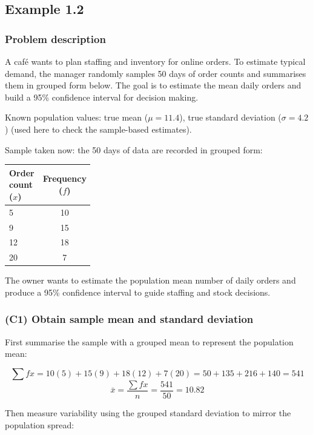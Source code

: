 \subsection{Example 1.2}\label{sec:interval-example1-2}

\subsubsection{Problem description}\label{subsec:interval-example1-2-problem}

A café wants to plan staffing and inventory for online orders. To estimate typical demand, the manager randomly samples 50 days of order counts and summarises them in grouped form below. The goal is to estimate the mean daily orders and build a 95\% confidence interval for decision making.

Known population values: true mean (\(\mu = 11.4\)), true standard deviation (\(\sigma = 4.2\)) (used here to check the sample-based estimates).

Sample taken now: the 50 days of data are recorded in grouped form:

\begin{center}
	\begin{tabularx}{0.55\linewidth}{@{}L{0.28\linewidth}C@{}}
		\toprule
		Order count (\(x\)) & Frequency (\(f\)) \\
		 & 10 \\
		9 & 15 \\
		12 & 18 \\
		20 & 7 \\
		\bottomrule
	\end{tabularx}
\end{center}

The owner wants to estimate the population mean number of daily orders and produce a 95\% confidence interval to guide staffing and stock decisions.


\subsubsection{(C1) Obtain sample mean and standard deviation}\label{subsubsec:interval-example1-2-c1}

First summarise the sample with a grouped mean to represent the population mean:

\[
\sum f x = 10(5) + 15(9) + 18(12) + 7(20) = 50 + 135 + 216 + 140 = 541
\]
\[
\bar{x} = \frac{\sum f x}{n} = \frac{541}{50} = 10.82
\]

Then measure variability using the grouped standard deviation to mirror the population spread:


